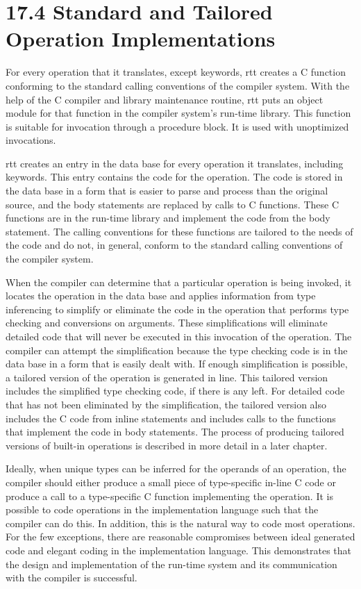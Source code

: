 \section[17.4 Standard and Tailored Operation Implementations]{17.4 Standard and Tailored Operation Implementations}

For every operation that it translates, except keywords, rtt creates a
C function conforming to the standard calling conventions of the
compiler system. With the help of the C compiler and library
maintenance routine, rtt puts an object module for that function in
the compiler system's run-time library. This function is suitable for
invocation through a procedure block. It is used with unoptimized
invocations.

rtt creates an entry in the data base for every operation it
translates, including keywords. This entry contains the code for the
operation. The code is stored in the data base in a form that is
easier to parse and process than the original source, and the body
statements are replaced by calls to C functions. These C functions are
in the run-time library and implement the code from the body
statement. The calling conventions for these functions are tailored to
the needs of the code and do not, in general, conform to the standard
calling conventions of the compiler system.

When the compiler can determine that a particular operation is being
invoked, it locates the operation in the data base and applies
information from type inferencing to simplify or eliminate the code in
the operation that performs type checking and conversions on
arguments. These simplifications will eliminate detailed code that
will never be executed in this invocation of the operation. The
compiler can attempt the simplification because the type checking code
is in the data base in a form that is easily dealt with. If enough
simplification is possible, a tailored version of the operation is
generated in line. This tailored version includes the simplified type
checking code, if there is any left.  For detailed code that has not
been eliminated by the simplification, the tailored version also
includes the C code from inline statements and includes calls to the
functions that implement the code in body statements. The process of
producing tailored versions of built-in operations is described in
more detail in a later chapter.

Ideally, when unique types can be inferred for the operands of an
operation, the compiler should either produce a small piece of
type-specific in-line C code or produce a call to a type-specific C
function implementing the operation. It is possible to code operations
in the implementation language such that the compiler can do this. In
addition, this is the natural way to code most operations. For the few
exceptions, there are reasonable compromises between ideal generated
code and elegant coding in the implementation language. This
demonstrates that the design and implementation of the run-time system
and its communication with the compiler is successful.

